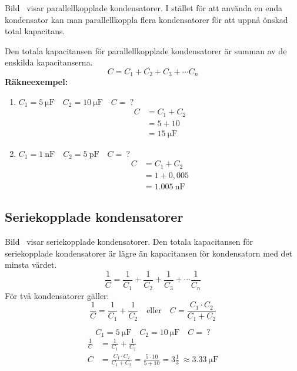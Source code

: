 
Bild~ visar parallellkopplade kondensatorer.
I stället för att använda en enda kondensator kan man parallellkoppla flera
kondensatorer för att uppnå önskad total kapacitans.

Den totala kapacitansen för parallellkopplade kondensatorer är summan av de
enskilda kapacitanserna.
%
\[
  C = C_1 + C_2 + C_3 + \cdots C_n
\]
%
\textbf{Räkneexempel:}
\begin{enumerate}
\item \(C_1 = \qty{5}{\micro\farad} \quad C_2 = \qty{10}{\micro\farad} \quad C =\ ?\)
  \begin{align*}
    C &= C_1 + C_2 \\[1ex]
    &= 5 + 10 \\[1ex]
    &= \qty{15}{\micro\farad}
  \end{align*}
\item \(C_1 = \qty{1}{\nano\farad} \quad C_2 = \qty{5}{\pico\farad} \quad C =\ ?\)
  \begin{align*}
    C &= C_1 + C_2 \\[1ex]
    &= 1 + 0,005 \\[1ex]
    &= \qty{1,005}{\nano\farad}
  \end{align*}
\end{enumerate}

\subsection{Seriekopplade kondensatorer}
\label{seriekopplade_kondensatorer}


Bild~ visar seriekopplade kondensatorer.
Den totala kapacitansen för seriekopplade kondensatorer är lägre än kapacitansen
för kondensatorn med det minsta värdet.
%
\[
\frac{1}{C} = \frac{1}{C_1} + \frac{1}{C_2} +
\frac{1}{C_3} + \cdots \frac{1}{C_n}
\]
%
För två kondensatorer gäller:
\[
  \frac{1}{C} = \frac{1}{C_1} + \frac{1}{C_2} \quad \text{eller} \quad
  C = \frac{C_1 \cdot C_2}{C_1 + C_2}
\]
\begin{exempelbox}
\noindent
\[ C_1 = \qty{5}{\micro\farad} \quad C_2 = \qty{10}{\micro\farad} \quad C =\ ? \]
\tcblower
    \begin{align*}
      \frac{1}{C} &= \frac{1}{C_1} + \frac{1}{C_2} \\[1ex]
      C &= \frac{C_1 \cdot C_2}{C_1 + C_2}
      = \frac{5 \cdot 10}{5 + 10}
      = 3\frac{1}{3}\
      \approx \qty{3,33}{\micro\farad}
    \end{align*}
\end{exempelbox}

